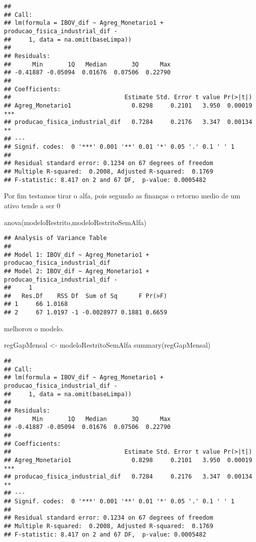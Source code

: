 \documentclass[
]{article}
\newenvironment{Shaded}{\begin{snugshade}}{\end{snugshade}}
\newcommand{\FunctionTok}[1]{\textcolor[rgb]{0.00,0.00,0.00}{#1}}
\newcommand{\NormalTok}[1]{#1}
\newcommand{\OtherTok}[1]{\textcolor[rgb]{0.56,0.35,0.01}{#1}}
\begin{document}
\begin{verbatim}
## 
## Call:
## lm(formula = IBOV_dif ~ Agreg_Monetario1 + producao_fisica_industrial_dif - 
##     1, data = na.omit(baseLimpa))
## 
## Residuals:
##      Min       1Q   Median       3Q      Max 
## -0.41887 -0.05094  0.01676  0.07506  0.22790 
## 
## Coefficients:
##                                Estimate Std. Error t value Pr(>|t|)    
## Agreg_Monetario1                 0.8298     0.2101   3.950  0.00019 ***
## producao_fisica_industrial_dif   0.7284     0.2176   3.347  0.00134 ** 
## ---
## Signif. codes:  0 '***' 0.001 '**' 0.01 '*' 0.05 '.' 0.1 ' ' 1
## 
## Residual standard error: 0.1234 on 67 degrees of freedom
## Multiple R-squared:  0.2008, Adjusted R-squared:  0.1769 
## F-statistic: 8.417 on 2 and 67 DF,  p-value: 0.0005482
\end{verbatim}

Por fim testamos tirar o alfa, pois segundo as finanças o retorno medio
de um ativo tende a ser 0

\begin{Shaded}
\begin{Highlighting}[]
\FunctionTok{anova}\NormalTok{(modeloRestrito,modeloRestritoSemAlfa)}
\end{Highlighting}
\end{Shaded}

\begin{verbatim}
## Analysis of Variance Table
## 
## Model 1: IBOV_dif ~ Agreg_Monetario1 + producao_fisica_industrial_dif
## Model 2: IBOV_dif ~ Agreg_Monetario1 + producao_fisica_industrial_dif - 
##     1
##   Res.Df    RSS Df  Sum of Sq      F Pr(>F)
## 1     66 1.0168                            
## 2     67 1.0197 -1 -0.0028977 0.1881 0.6659
\end{verbatim}

melhorou o modelo.

\begin{Shaded}
\begin{Highlighting}[]
\NormalTok{regGapMensal }\OtherTok{\textless{}{-}}\NormalTok{ modeloRestritoSemAlfa}
\FunctionTok{summary}\NormalTok{(regGapMensal)}
\end{Highlighting}
\end{Shaded}

\begin{verbatim}
## 
## Call:
## lm(formula = IBOV_dif ~ Agreg_Monetario1 + producao_fisica_industrial_dif - 
##     1, data = na.omit(baseLimpa))
## 
## Residuals:
##      Min       1Q   Median       3Q      Max 
## -0.41887 -0.05094  0.01676  0.07506  0.22790 
## 
## Coefficients:
##                                Estimate Std. Error t value Pr(>|t|)    
## Agreg_Monetario1                 0.8298     0.2101   3.950  0.00019 ***
## producao_fisica_industrial_dif   0.7284     0.2176   3.347  0.00134 ** 
## ---
## Signif. codes:  0 '***' 0.001 '**' 0.01 '*' 0.05 '.' 0.1 ' ' 1
## 
## Residual standard error: 0.1234 on 67 degrees of freedom
## Multiple R-squared:  0.2008, Adjusted R-squared:  0.1769 
## F-statistic: 8.417 on 2 and 67 DF,  p-value: 0.0005482
\end{verbatim}
\end{document}
